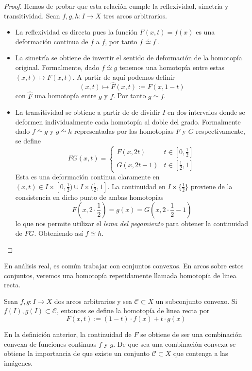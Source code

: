 \begin{proof}
  Hemos de probar que esta relación cumple la reflexividad, simetría y
  transitividad. Sean \(f,g,h : I \to X\) tres arcos arbitrarios.
  \begin{itemize}
  \item La reflexividad es directa pues la función \(F(x,t) = f(x)\) es
    una deformación continua de \(f\) a \(f\), por tanto \(f \stackrel{.}{\simeq}
    f\).

  \item La simetría se obtiene de invertir el sentido de deformación de la
    homotopía original. Formalmente, dado \(f \stackrel{.}{\simeq} g\)
    tenemos una homotopía entre estas \((x,t) \mapsto F(x,t)\). A partir
    de aquí podemos definir
    \begin{equation}
      \label{eq:homotopy-simetry}
      (x,t) \mapsto \hat{F}(x,t) := F(x,1-t)
    \end{equation}
    con \(\hat{F}\) una homotopía entre \(g\) y \(f\). Por tanto \(g
    \stackrel{.}{\simeq} f\).

  \item La transitividad se obtiene a partir de de dividir \(I\) en dos
    intervalos donde se deformen individualmente cada homotopía al doble
    del grado. Formalmente dado \(f \stackrel{.}{\simeq} g\) y \(g
    \stackrel{.}{\simeq} h\) representadas por las homotopías \(F\) y
    \(G\) respectivamente, se define
    \[ FG(x,t) = \begin{cases}
        F(x,2t) & t \in [0,\frac{1}{2}] \\
        G(x,2t - 1) & t \in [ \frac{1}{2} , 1]
      \end{cases}
    \]
    Esta es una deformación continua claramente en \((x,t) \in I \times
    [0, \frac{1}{2}) \cup I \times (\frac{1}{2}, 1]\). La continuidad en
    \(I \times \{\frac{1}{2}\}\) proviene de la consistencia en dicho
    punto de ambas homotopías
    \[ F(x,2 \cdot \frac{1}{2}) = g(x) = G(x, 2 \cdot \frac{1}{2} - 1)\]
    lo que nos permite utilizar el \emph{lema del pegamiento}
    \cite[p.~108]{munkres} para obtener la continuidad de \(FG\).
    Obteniendo así \(f \stackrel{.}{\simeq} h\).
  \end{itemize}
\end{proof}

En análisis real, es común trabajar con conjuntos convexos. En arcos
sobre estos conjuntos, veremos una homotopía repetidamente llamada
homotopía de linea recta.
\begin{definicion}\label{def:homotopia-linea}
  Sean \(f,g : I \to X\) dos arcos arbitrarios y sea \(\mathcal C
  \subset X\) un subconjunto convexo. Si \(f(I),g(I) \subset \mathcal
  C\), entonces se define la homotopía de linea recta por
  \[ F(x,t) := (1-t) \cdot f(x) + t \cdot g(x) \]
\end{definicion}
\begin{acotacion}
  En la definición anterior, la continuidad de \(F\) se obtiene de ser
  una combinación convexa de funciones continuas \(f\) y \(g\). De que
  sea una combinación convexa se obtiene la importancia de que existe un
  conjunto \(\mathcal C \subset X\) que contenga a las imágenes.
\end{acotacion}


